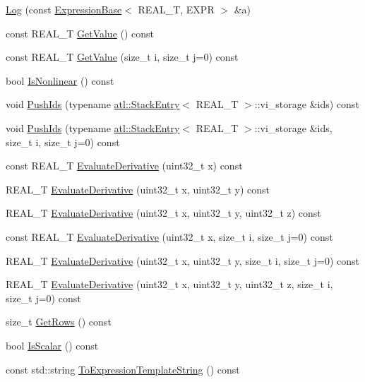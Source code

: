 \begin{DoxyCompactItemize}
\item 
\hyperlink{structatl_1_1_log_a01abc5bb1b4709e5fe34aa8bd568b23e}{Log} (const \hyperlink{structatl_1_1_expression_base}{Expression\+Base}$<$ R\+E\+A\+L\+\_\+\+T, E\+X\+P\+R $>$ \&a)
\item 
const R\+E\+A\+L\+\_\+\+T \hyperlink{structatl_1_1_log_a8af40586a9e836d67ce0ddf122992b95}{Get\+Value} () const 
\item 
const R\+E\+A\+L\+\_\+\+T \hyperlink{structatl_1_1_log_ac6862ef00614119ee8292e4ef4d5727c}{Get\+Value} (size\+\_\+t i, size\+\_\+t j=0) const 
\item 
bool \hyperlink{structatl_1_1_log_a553838422a6da61faaafe8a4e151f6ff}{Is\+Nonlinear} () const 
\item 
void \hyperlink{structatl_1_1_log_a9b2175cc67290f3ca534d51ff1a21c39}{Push\+Ids} (typename \hyperlink{structatl_1_1_stack_entry}{atl\+::\+Stack\+Entry}$<$ R\+E\+A\+L\+\_\+\+T $>$\+::vi\+\_\+storage \&ids) const 
\item 
void \hyperlink{structatl_1_1_log_ae123e08e7c97c734d3e736304f0c88ac}{Push\+Ids} (typename \hyperlink{structatl_1_1_stack_entry}{atl\+::\+Stack\+Entry}$<$ R\+E\+A\+L\+\_\+\+T $>$\+::vi\+\_\+storage \&ids, size\+\_\+t i, size\+\_\+t j=0) const 
\item 
const R\+E\+A\+L\+\_\+\+T \hyperlink{structatl_1_1_log_a3898bf1729ca810acc0c912dbfad5e5c}{Evaluate\+Derivative} (uint32\+\_\+t x) const 
\item 
R\+E\+A\+L\+\_\+\+T \hyperlink{structatl_1_1_log_abc5371df8120d81e5f5eddec9eeaa920}{Evaluate\+Derivative} (uint32\+\_\+t x, uint32\+\_\+t y) const 
\item 
R\+E\+A\+L\+\_\+\+T \hyperlink{structatl_1_1_log_a2795bc68d354d69bdca6f2f2676bac21}{Evaluate\+Derivative} (uint32\+\_\+t x, uint32\+\_\+t y, uint32\+\_\+t z) const 
\item 
const R\+E\+A\+L\+\_\+\+T \hyperlink{structatl_1_1_log_ab1a2668eddc4e78a9d3aff7a4a5277c2}{Evaluate\+Derivative} (uint32\+\_\+t x, size\+\_\+t i, size\+\_\+t j=0) const 
\item 
R\+E\+A\+L\+\_\+\+T \hyperlink{structatl_1_1_log_a6ac182aae08d94e40a95c45e08a30303}{Evaluate\+Derivative} (uint32\+\_\+t x, uint32\+\_\+t y, size\+\_\+t i, size\+\_\+t j=0) const 
\item 
R\+E\+A\+L\+\_\+\+T \hyperlink{structatl_1_1_log_a5afea2c7c9cabf2d692d360d16ee517f}{Evaluate\+Derivative} (uint32\+\_\+t x, uint32\+\_\+t y, uint32\+\_\+t z, size\+\_\+t i, size\+\_\+t j=0) const 
\item 
size\+\_\+t \hyperlink{structatl_1_1_log_a417b12ff73ea48f7c88f2356d4080ea3}{Get\+Rows} () const 
\item 
bool \hyperlink{structatl_1_1_log_adb6a4b2be4a658024101b80476a57b55}{Is\+Scalar} () const 
\item 
const std\+::string \hyperlink{structatl_1_1_log_aba69df497f2919bec41a11d2fce6b581}{To\+Expression\+Template\+String} () const 
\end{DoxyCompactItemize}
